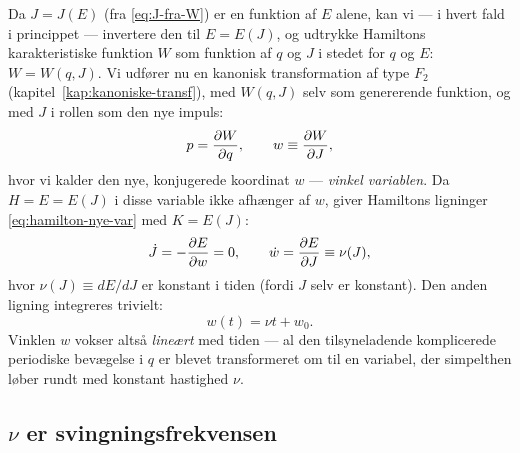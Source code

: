 Da $J=J(E)$ (fra \eqref{eq:J-fra-W}) er en funktion af $E$ alene, kan
vi — i hvert fald i princippet — invertere den til $E=E(J)$, og
udtrykke Hamiltons karakteristiske funktion $W$ som funktion af $q$ og
$J$ i stedet for $q$ og $E$: $W=W(q,J)$. Vi udfører nu en kanonisk
transformation af type $F_2$ (kapitel~\ref{kap:kanoniske-transf}), med
$W(q,J)$ selv som genererende funktion, og med $J$ i rollen som den
nye impuls:
\begin{equation}
  p = \pdv{W}{q}, \qquad w \equiv \pdv{W}{J},
  \label{eq:def-w}
\end{equation}
hvor vi kalder den nye, konjugerede koordinat $w$ — \emph{vinkel\-
variablen}. Da $H=E=E(J)$ i disse variable ikke afhænger af $w$, giver
Hamiltons ligninger \eqref{eq:hamilton-nye-var} med $K=E(J)$:
\begin{equation}
  \dot J = -\pdv{E}{w} = 0, \qquad \dot w = \pdv{E}{J} \equiv \nu(J),
  \label{eq:hamilton-vinkel}
\end{equation}
hvor $\nu(J)\equiv dE/dJ$ er konstant i tiden (fordi $J$ selv er
konstant). Den anden ligning integreres trivielt:
\begin{equation}
  w(t) = \nu t + w_0.
  \label{eq:w-lineaer}
\end{equation}
Vinklen $w$ vokser altså \emph{lineært} med tiden — al den
tilsyneladende komplicerede periodiske bevægelse i $q$ er blevet
transformeret om til en variabel, der simpelthen løber rundt med
konstant hastighed $\nu$.

\subsection{$\nu$ er svingningsfrekvensen}

